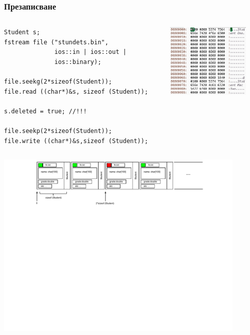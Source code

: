 \documentclass{beamer}
\begin{document}
\begin{frame}[fragile]
\frametitle{Презаписване}

\vspace{-20px}



\begin{columns}[t]
  \begin{column}{0.65\textwidth}

\begin{flushleft}
\begin{lstlisting}
Student s;
fstream file ("stundets.bin", 
              ios::in | ios::out | 
              ios::binary);

file.seekg(2*sizeof(Student));
file.read ((char*)&s, sizeof (Student));

s.deleted = true; //!!!

file.seekp(2*sizeof(Student));
file.write ((char*)&s,sizeof (Student));
\end{lstlisting}
\end{flushleft}   


  \end{column}
  \begin{column}{0.35\textwidth}
\begin{flushright}
  \includegraphics[width=4.0cm]{images/binfiless}
\end{flushright}

  \end{column}
\end{columns}

\vspace{10px}
\includegraphics[width=12cm]{images/binfileflag}


\end{frame}
\end{document}
